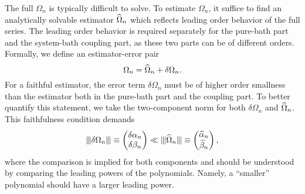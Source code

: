 \documentclass[pra,reprint,superscriptaddress]{revtex4-2}
\begin{document}
The full $\Omega_{n}$ is typically difficult to solve.
To estimate $\Omega_{n}$, it suffice to find an analytically solvable estimator $\widehat{\Omega}_{n}$ which reflects leading order behavior of the full series. 
The leading order behavior is required separately for the pure-bath part and the system-bath coupling part, as these two parts can be of different orders. 
Formally, we define an estimator-error pair 
\begin{equation}
 \Omega_{n} = \widehat{\Omega}_{n} + \delta\Omega_{n}.
\end{equation}
For a faithful estimator, the error term $ \delta\Omega_{n}$ must be of higher order smallness than the estimator both in the pure-bath part and the coupling part. To better quantify this statement, we take the two-component norm for both 
$\delta\Omega_{n}$ and $\widehat{\Omega}_{n}$. This faithfulness condition demands
\begin{equation}\label{eq:tcn-esterr}
\opnorm{\delta\Omega_{n}}\equiv
\begin{pmatrix}
\delta\alpha_{n}\\
\delta\beta_{n}
\end{pmatrix}
\ll 
\opnorm{\Ohat_{n}}\equiv\begin{pmatrix}
\widehat\alpha_{n}\\
\widehat\beta_{n}
\end{pmatrix},
\end{equation}
where the comparison is implied for both components and should be understood by comparing the leading powers of the polynomials. Namely,
a ``smaller'' polynomial should have a larger leading power. 


\end{document}
